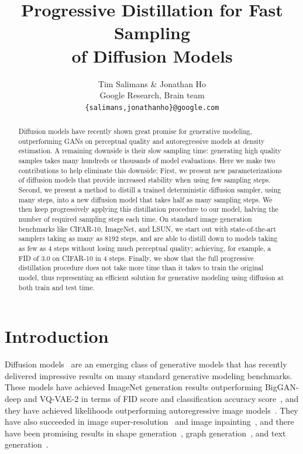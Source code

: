 \documentclass[hidelinks]{article} %
\title{Progressive Distillation for Fast Sampling\\ of Diffusion Models}
\author{Tim Salimans \& Jonathan Ho \\
Google Research, Brain team\\
\texttt{\{salimans,jonathanho\}@google.com} }
\begin{document}
\maketitle

\begin{abstract}
Diffusion models have recently shown great promise for generative modeling, outperforming GANs on perceptual quality and autoregressive models at density estimation. A remaining downside is their slow sampling time: generating high quality samples takes many hundreds or thousands of model evaluations. Here we make two contributions to help eliminate this downside: First, we present new parameterizations of diffusion models that provide increased stability when using few sampling steps. Second, we present a method to distill a trained deterministic diffusion sampler, using many steps, into a new diffusion model that takes half as many sampling steps. We then keep progressively applying this distillation procedure to our model, halving the number of required sampling steps each time. On standard image generation benchmarks like CIFAR-10, ImageNet, and LSUN, we start out with state-of-the-art samplers taking as many as 8192 steps, and are able to distill down to models taking as few as 4 steps without losing much perceptual quality; achieving, for example, a FID of 3.0 on CIFAR-10 in 4 steps. Finally, we show that the full progressive distillation procedure does not take more time than it takes to train the original model, thus representing an efficient solution for generative modeling using diffusion at both train and test time.
\end{abstract}

\section{Introduction}
Diffusion models~\citep{sohl2015deep,song2019generative,ho2020denoising} are an emerging class of generative models that has recently delivered impressive results on many standard generative modeling benchmarks.
These models have achieved ImageNet generation results outperforming BigGAN-deep and VQ-VAE-2 in terms of FID score and classification accuracy score~\citep{ho2021cascaded,dhariwal2021diffusion}, and they have achieved likelihoods outperforming autoregressive image  models~\citep{kingma2021variational,song2021maximum}. They have also succeeded in image super-resolution~\citep{saharia2021image, li2021srdiff} and  image inpainting~\citep{song2020score}, and there have been promising results in shape generation~\citep{cai2020learning}, graph generation~\citep{niu2020permutation}, and text generation~\citep{hoogeboom2021argmax,austin2021structured}.
\end{document}
